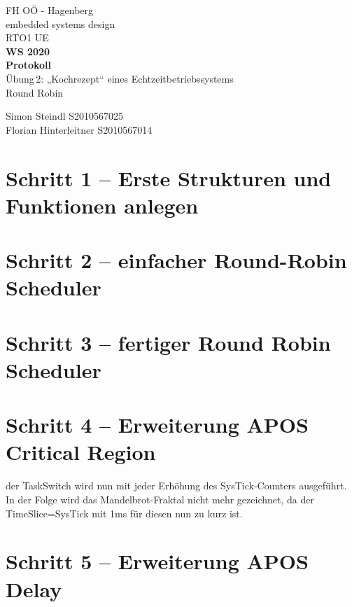 \documentclass{article}
\begin{document}
\begin{titlepage}
	\begin{center}
		{\large{FH OÖ - Hagenberg \\ embedded systems design}\\\vspace*{4cm}}
		\small{RTO1 UE}\\
		\textbf{WS 2020}\\\vspace*{2cm}
		\Huge{\textbf{Protokoll}}\\\vspace*{1cm}
		\huge{Übung\,2: „Kochrezept“ eines Echtzeitbetriebssystems\\ \large{ Round Robin } } \vspace*{90mm}
		
		\small{Simon Steindl  S2010567025	\\
		Florian Hinterleitner S2010567014	\\
		}
	\end{center}
\end{titlepage}


\section*{Schritt 1 – Erste Strukturen und Funktionen anlegen		}

\section*{Schritt 2 – einfacher Round-Robin Scheduler		}

\section*{Schritt 3 – fertiger Round Robin Scheduler		}

\section*{Schritt 4 – Erweiterung APOS Critical Region		}

der TaskSwitch wird nun mit jeder Erhöhung des SysTick-Counters ausgeführt.
In der Folge wird das Mandelbrot-Fraktal nicht mehr gezeichnet, da der TimeSlice=SysTick mit 1ms für diesen nun zu kurz ist.

\section*{Schritt 5 – Erweiterung APOS Delay		}
\end{document}

